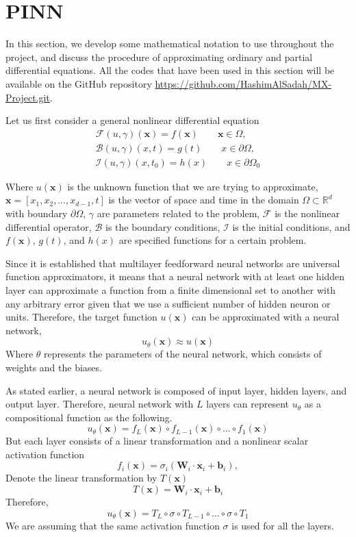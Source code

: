 \documentclass[a4paper, onecolumn, 12pt]{article}
\begin{document}
\section{PINN}
In this section, we develop some mathematical notation to use throughout the project, 
and discuss the procedure of approximating ordinary and partial differential equations. All the 
codes that have been used in this section will be available on the GitHub repository 
\url{https://github.com/HashimAlSadah/MX-Project.git}.

Let us first consider a general nonlinear differential equation
\begin{align}
\mathcal{F}(u, \gamma)(\mathbf{x}) = f(\mathbf{x}) \qquad \mathbf{x} \in  \Omega,\\
\mathcal{B}(u, \gamma)(x, t) = g(t) \qquad x \in \partial{\Omega}, \\
\mathcal{I}(u, \gamma)(x, t_0) = h(x) \qquad x \in \partial{\Omega_0}
\end{align}

Where $u(\mathbf{x})$ is the unknown function that we are trying to approximate, 
$\mathbf{x} = [ x_1, x_2, \dots, x_{d-1}, t]$ is the vector of space and time 
in the domain $\Omega \subset \mathbb{R}^d$  with boundary $\partial{\Omega}$, 
$\gamma$ are parameters related to the problem, $\mathcal{F}$ is the nonlinear 
differential operator, $\mathcal{B}$ is the boundary conditions, $\mathcal{I}$ is 
the initial conditions, and $f(\mathbf{x})$, $g(t)$, and $h(x)$ are specified 
functions for a certain problem. 

Since it is established that multilayer feedforward neural networks 
are universal function approximators\cite{hornik1989multilayer}, it means that 
a neural network with at least one hidden layer can approximate a function 
from a finite dimensional set to another with 
any arbitrary error given that we use a sufficient number of hidden neuron or units.
Therefore, the target function $u(\mathbf{x})$ can be approximated with a neural network,
$$
u_{\theta}(\mathbf{x}) \approx u(\mathbf{x})
$$ 
Where $\theta$ represents the parameters of the neural network, which consists of
weights and the biases.

As stated earlier, a neural network is composed of input layer, 
hidden layers, and output layer. Therefore, neural network with $L$
layers can represent $u_\theta$ as a compositional function as the following.
$$
u_{\theta}(\mathbf{x}) = f_L(\mathbf{x}) \circ f_{L-1}(\mathbf{x}) \circ \dots \circ f_1(\mathbf{x})
$$
But each layer consists of a linear transformation and a nonlinear scalar activation function
$$
f_i(\mathbf{x}) = \sigma_i \left( \mathbf{W}_i \cdot \mathbf{x}_i + \mathbf{b}_i \right), 
$$
Denote the linear transformation by $T(\mathbf{x})$
$$
T(\mathbf{x}) = \mathbf{W}_i \cdot \mathbf{x}_i + \mathbf{b}_i 
$$
Therefore, 
\begin{equation}
u_{\theta}(\mathbf{x}) = T_L \circ \sigma \circ T_{L-1} \circ \dots \circ \sigma \circ T_1
\end{equation}
We are assuming that the same activation function $\sigma$ is used for all the layers.
\end{document}
